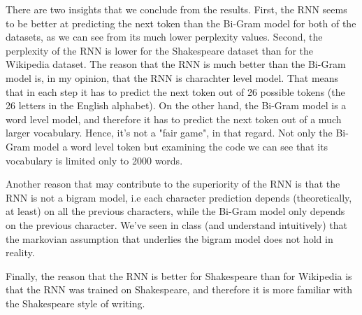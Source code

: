 There are two insights that we conclude from the results. First, the RNN seems to be better at predicting the next token than the Bi-Gram model for both of the datasets, as we can see from its much lower perplexity values.
Second, the perplexity of the RNN is lower for the Shakespeare dataset than for the Wikipedia dataset.
The reason that the RNN is much better than the Bi-Gram model is, in my opinion, that the RNN is charachter level model. 
That means that in each step it has to predict the next token out of 26 possible tokens (the 26 letters in the English alphabet). 
On the other hand, the Bi-Gram model is a word level model, and therefore it has to predict the next token out of a much larger vocabulary. Hence, it's not a "fair game", in that regard. 
Not only the Bi-Gram model a word level token but examining the code we can see that its vocabulary is limited only to 2000 words.

Another reason that may contribute to the superiority of the RNN is that the RNN is not a bigram model, i.e each character prediction depends (theoretically, at least) on all the previous characters, while the Bi-Gram model only depends on the previous character. 
We've seen in class (and understand intuitively) that the markovian assumption that underlies the bigram model does not hold in reality.

Finally, the reason that the RNN is better for Shakespeare than for Wikipedia is that the RNN was trained on Shakespeare, and therefore it is more familiar with the Shakespeare style of writing.